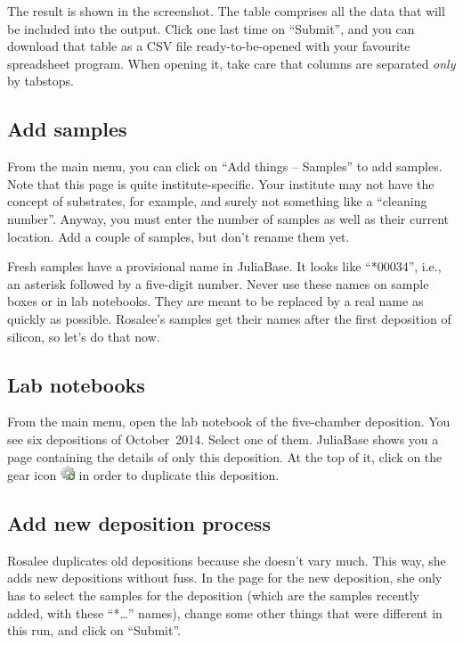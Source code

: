 \documentclass[a4paper,11pt,english]{sphinxmanual}
\begin{document}
The result is shown in the screenshot.  The table comprises all the data that
will be included into the output.  Click one last time on “Submit”, and you can
download that table as a CSV file ready-to-be-opened with your favourite
spreadsheet program.  When opening it, take care that columns are separated
\emph{only} by tabstops.


\subsection{Add samples}
\label{demo:add-samples}\label{demo:index-12}
From the main menu, you can click on “Add things – Samples” to add samples.
Note that this page is quite institute-specific.  Your institute may not have
the concept of substrates, for example, and surely not something like a
“cleaning number”.  Anyway, you must enter the number of samples as well as
their current location.  Add a couple of samples, but don't rename them yet.

Fresh samples have a provisional name in JuliaBase.  It looks like “*00034”,
i.e., an asterisk followed by a five-digit number.  Never use these names on
sample boxes or in lab notebooks.  They are meant to be replaced by a real name
as quickly as possible.  Rosalee's samples get their names after the first
deposition of silicon, so let's do that now.


\subsection{Lab notebooks}
\label{demo:lab-notebooks}\label{demo:index-13}
From the main menu, open the lab notebook of the five-chamber deposition.  You
see six depositions of October 2014.  Select one of them.  JuliaBase shows you
a page containing the details of only this deposition.  At the top of it, click
on the gear icon \includegraphics{cog_add.png} in order to duplicate this deposition.


\subsection{Add new deposition process}
\label{demo:add-new-deposition-process}
Rosalee duplicates old depositions because she doesn't vary much.  This way,
she adds new depositions without fuss.  In the page for the new deposition, she
only has to select the samples for the deposition (which are the samples
recently added, with these “*…” names), change some other things that were
different in this run, and click on “Submit”.
\end{document}
